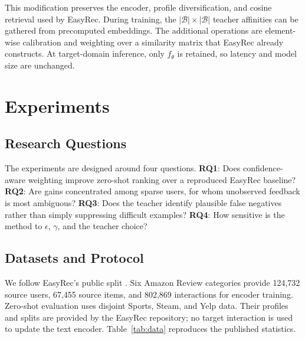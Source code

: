 \documentclass[11pt]{article}
\begin{document}
This modification preserves the encoder, profile diversification, and cosine retrieval used by EasyRec.
During training, the $|\mathcal{B}|\times|\mathcal{B}|$ teacher affinities can be gathered from precomputed embeddings.
The additional operations are element-wise calibration and weighting over a similarity matrix that EasyRec already constructs.
At target-domain inference, only $f_\theta$ is retained, so latency and model size are unchanged.

\section{Experiments}

\subsection{Research Questions}

The experiments are designed around four questions.
\textbf{RQ1}: Does confidence-aware weighting improve zero-shot ranking over a reproduced EasyRec baseline?
\textbf{RQ2}: Are gains concentrated among sparse users, for whom unobserved feedback is most ambiguous?
\textbf{RQ3}: Does the teacher identify plausible false negatives rather than simply suppressing difficult examples?
\textbf{RQ4}: How sensitive is the method to $\epsilon$, $\gamma$, and the teacher choice?

\subsection{Datasets and Protocol}

We follow EasyRec's public split \citep{ren-huang-2025-easyrec}.
Six Amazon Review categories \citep{ni2019amazon} provide 124,732 source users, 67,455 source items, and 802,869 interactions for encoder training.
Zero-shot evaluation uses disjoint Sports, Steam, and Yelp data.
Their profiles and splits are provided by the EasyRec repository; no target interaction is used to update the text encoder.
Table~\ref{tab:data} reproduces the published statistics.
\end{document}
